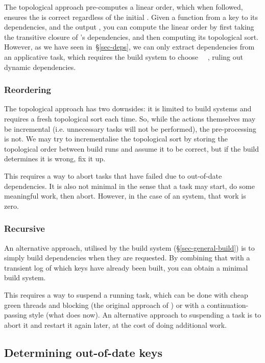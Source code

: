 The topological approach pre-computes a linear order, which when followed, ensures
the  is correct regardless of the initial . Given a function
from a key to its dependencies, and the output , you can compute the
linear order by first taking the transitive closure of 's dependencies,
and then computing its topological sort. However, as we have seen
in~\S\ref{sec-deps}, we can only extract dependencies from an applicative task,
which requires the build system to choose ~\hs{=}~, ruling
out dynamic dependencies.

\subsubsection{Reordering}

The topological approach has two downsides: it is limited to 
build systems and requires a fresh topological sort each time.  So, while the
actions themselves may be incremental (i.e. unnecessary tasks will not be performed),
the pre-processing is not. We may try to incrementalise the topological sort by
storing the topological order between build runs and assume it to
be correct, but if the build determines it is wrong, fix it up.

This requires a way to abort tasks that have failed due to out-of-date
dependencies. It is also not minimal in the sense that a task may start, do some
meaningful work, then abort. However, in the case of an  system,
that work is zero.

\subsubsection{Recursive}

An alternative approach, utilised by the  build system
(\S\ref{sec-general-build}) is to simply build dependencies when they are
requested. By combining that with a transient log of which keys have already
been built, you can obtain a minimal build system.

This requires a way to suspend a running task, which can be done with cheap
green threads and blocking (the original approach of \Shake) or with a
continuation-passing style (what \Shake does now). An alternative approach to
suspending a task is to abort it and restart it again later, at the cost
of doing additional work.

\subsection{Determining out-of-date keys} \label{sec-out-of-date}

